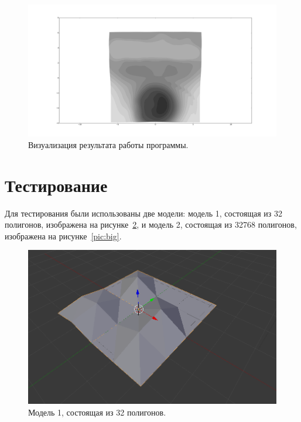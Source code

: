 \documentclass[12pt,a4paper,oneside]{extarticle}
\begin{document}
        \begin{figure}[h!]
            \center
            \includegraphics[scale=0.25]{result.png}
            \caption{Визуализация результата работы программы.}
            \label{pic:result}
        \end{figure}
\clearpage

\section{Тестирование}
    Для тестирования были использованы две модели: модель 1, состоящая из 32 полигонов, изображена на рисунке~\ref{pic:mini}, и модель 2, состоящая из 32768 полигонов, изображена на рисунке~\ref{pic:big}.
    \begin{figure}[h!]
            \center
            \includegraphics[scale=0.4]{mini.png}
            \caption{Модель 1, состоящая из 32 полигонов.}
            \label{pic:mini}
    \end{figure}
\end{document}
